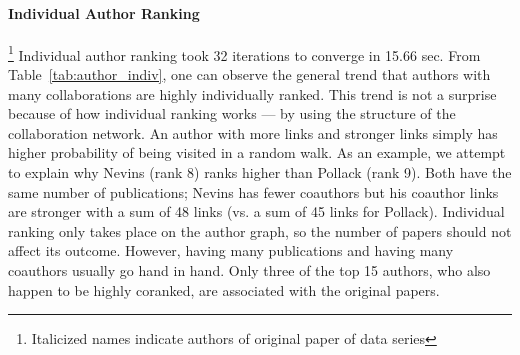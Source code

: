 \paragraph{Individual Author Ranking} \footnote{Italicized names indicate authors of original paper of data series}
Individual author ranking took 32 iterations to converge in 15.66 sec. From Table~\ref{tab:author_indiv}, one can observe the general trend that authors with many collaborations are highly individually ranked. This trend is not a surprise because of how individual ranking works --- by using the structure of the collaboration network. An author with more links and stronger links simply has higher probability of being visited in a random walk. As an example, we attempt to explain why Nevins (rank 8) ranks higher than Pollack (rank 9). Both have the same number of publications; Nevins has fewer coauthors but his coauthor links are stronger with a sum of 48 links (vs. a sum of 45 links for Pollack). Individual ranking only takes place on the author graph, so the number of papers should not affect its outcome. However, having many publications and having many coauthors usually go hand in hand. Only three of the top 15 authors, who also happen to be highly coranked, are associated with the original papers. 

    \begin{table}[h]
    \caption{Top Authors by Individual Ranking}
    \label{tab:author_indiv}
    \end{table}



